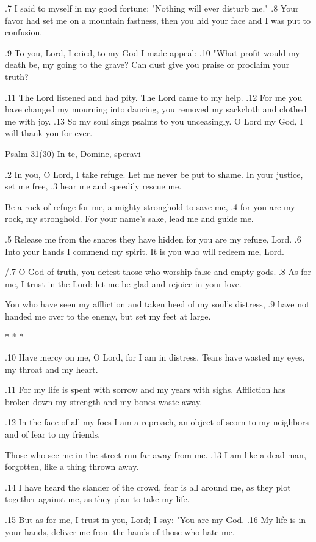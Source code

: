 .7 I said to myself in my good fortune:
"Nothing will ever disturb me."
.8 Your favor had set me on a mountain fastness,
then you hid your face and I was put to confusion.

.9 To you, Lord, I cried,
to my God I made appeal:
.10 "What profit would my death be, my going to the grave?
Can dust give you praise or proclaim your truth?

.11 The Lord listened and had pity.
The Lord came to my help.
.12 For me you have changed my mourning into dancing,
you removed my sackcloth and clothed me with joy.
.13 So my soul sings psalms to you unceasingly.
O Lord my God, I will thank you for ever.


Psalm 31(30) In te, Domine, speravi

.2 In you, O Lord, I take refuge.
Let me never be put to shame.
In your justice, set me free,
.3 hear me and speedily rescue me.

Be a rock of refuge for me,
a mighty stronghold to save me,
.4 for you are my rock, my stronghold.
For your name's sake, lead me and guide me.

.5 Release me from the snares they have hidden
for you are my refuge, Lord.
.6 Into your hands I commend my spirit.
It is you who will redeem me, Lord.

/.7 O God of truth, you detest
those who worship false and empty gods.
.8 As for me, I trust in the Lord:
let me be glad and rejoice in your love.

You who have seen my affliction
and taken heed of my soul's distress,
.9 have not handed me over to the enemy,
but set my feet at large.

* * *

.10 Have mercy on me, O Lord,
for I am in distress.
Tears have wasted my eyes,
my throat and my heart.

.11 For my life is spent with sorrow
and my years with sighs.
Affliction has broken down my strength
and my bones waste away.

.12 In the face of all my foes
I am a reproach,
an object of scorn to my neighbors
and of fear to my friends.

Those who see me in the street
run far away from me.
.13 I am like a dead man, forgotten,
like a thing thrown away.

.14 I have heard the slander of the crowd,
fear is all around me,
as they plot together against me,
as they plan to take my life.

.15 But as for me, I trust in you, Lord;
I say: "You are my God.
.16 My life is in your hands, deliver me
from the hands of those who hate me.

